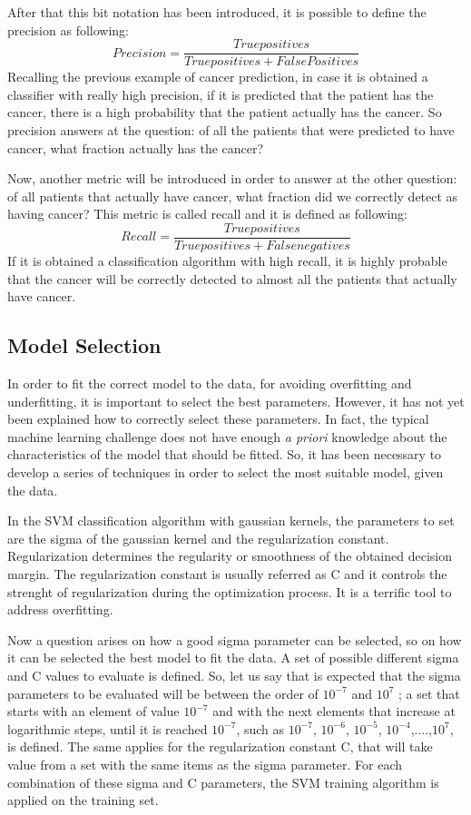 \documentclass[aps,letterpaper,10pt]{revtex4}
\begin{document}
After that this bit notation has been introduced, it is possible to define the precision as following:
\begin{equation}
Precision= \frac{True positives}{True positives + False Positives}
\end{equation}
Recalling the previous example of cancer prediction, in case it is obtained a classifier with really high precision, if it is predicted that the patient has the cancer, there is a high probability that the patient actually has the cancer. So precision answers at the question: of all the patients that were predicted to have cancer, what fraction actually has the cancer? 

Now, another metric will be introduced in order to answer at the other question: of all patients that actually have cancer, what fraction did we correctly detect as having cancer? This metric is called recall and it is defined as following:
\begin{equation}
Recall = \frac{True positives}{True positives + False negatives}
\end{equation}
If it is obtained a classification algorithm with high recall, it is highly probable that the
cancer will be correctly detected to almost all the patients that actually have cancer.

\subsection{Model Selection}
In order to fit the correct model to the data, for avoiding overfitting and underfitting, it is important to select the best parameters. However, it has not yet been explained how to correctly select these parameters. In fact, the typical machine learning challenge does not have enough \textit{a priori} knowledge about the characteristics of the model that should be fitted. So, it has been necessary to develop a series of techniques in order to select the most suitable model, given the data. 

In the SVM classification algorithm with gaussian kernels, the parameters to set are the sigma of the gaussian kernel and the regularization constant. Regularization determines the regularity or smoothness of the obtained decision margin. The regularization constant is usually referred as C and it controls the strenght of regularization during the optimization process. It is a terrific tool to address overfitting. 

Now a question arises on how a good sigma parameter can be selected, so on how it can be selected the best model to fit the data. A set of possible different sigma and C values to evaluate is defined. So, let us say that is expected that the sigma parameters to be evaluated will be between the order of $10^{-7}$ and $10^{7}$ ; a set that starts with an element of value $10^{-7}$ and with the next elements that increase at logarithmic steps, until it is reached $10^{-7}$, such as {$10^{-7}$, $10^{-6}$, $10^{-5}$, $10^{-4}$,....,$10^{7}$}, is defined. The same applies for the regularization constant C, that will take value from a set with the same items as the sigma parameter. For each combination of these sigma and C parameters, the SVM training algorithm is applied on the training set. 
\end{document}
